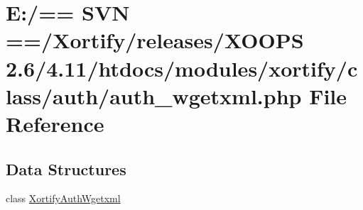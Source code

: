\hypertarget{auth__wgetxml_8php}{\section{E\-:/== S\-V\-N ==/\-Xortify/releases/\-X\-O\-O\-P\-S 2.6/4.11/htdocs/modules/xortify/class/auth/auth\-\_\-wgetxml.php File Reference}
\label{auth__wgetxml_8php}
}
\subsection*{Data Structures}
\begin{DoxyCompactItemize}
\item 
class \hyperlink{class_xortify_auth_wgetxml}{Xortify\-Auth\-Wgetxml}
\end{DoxyCompactItemize}
